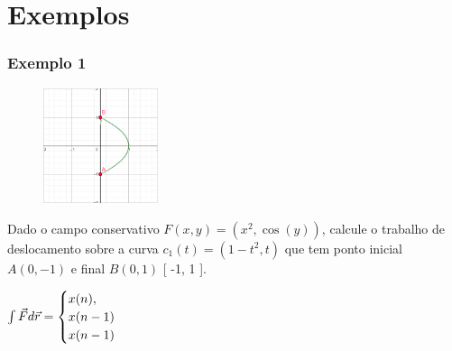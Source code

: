\documentclass{beamer}
\def\vec{\mathaccent "017E\relax }
\begin{document}
\section{Exemplos}

\begin{frame}
    \frametitle{Exemplo 1} 

    \begin{figure} %
        \vspace{-35pt}
        \centering
        \caption{}
        \includegraphics[width=0.30\textwidth]{grafico-exemplo-1.png}
        \label{fig:grafico-exemplo1}
    \end{figure}

    Dado o campo conservativo $ F(x, y) = ( x^2, \cos(y) ) $, calcule o trabalho de deslocamento sobre a 
    curva $ c_1(t) = ( 1 - t^2, t ) $ que tem ponto inicial $ A( 0, -1) $ e final $ B( 0, 1) $ [ -1, 1 ].

    $
        \int{} \vec{F} d\vec{r} =  
        \begin{cases}
            x(n),\\
            x(n-1)\\
            x(n-1)
        \end{cases}
    $
%     
%     
%     

\end{frame}

\frame{\printbibliography}
\end{document}
